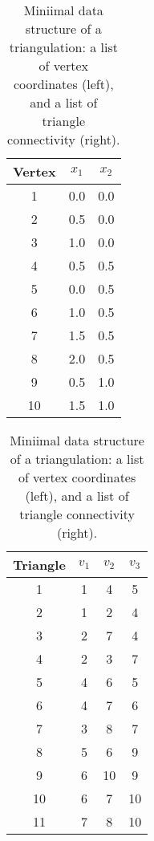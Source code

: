 \begin{table}[!htb]
  \centering
  \caption{Miniimal data structure of a triangulation: a list of vertex coordinates (left), and a list of triangle connectivity (right).}
  \label{tab:vertex-coordinates}
  \begin{minipage}[t]{0.45\textwidth}
    \centering
  \begin{tabular}{|c|c|c|}
  \hline
  \textbf{Vertex} & $x_1$ & $x_2$ \\ \hline
  1 & 0.0 & 0.0 \\ \hline
  2 & 0.5 & 0.0 \\ \hline
  3 & 1.0 & 0.0 \\ \hline
  4 & 0.5 & 0.5 \\ \hline
  5 & 0.0 & 0.5 \\ \hline
  6 & 1.0 & 0.5 \\ \hline
  7 & 1.5 & 0.5 \\ \hline
  8 & 2.0 & 0.5 \\ \hline
  9 & 0.5 & 1.0 \\ \hline
  10 & 1.5 & 1.0 \\ \hline
  \end{tabular}
\end{minipage}
\begin{minipage}[t]{0.45\textwidth}
  \centering
  \begin{tabular}{|c|c|c|c|}
    \hline
    \textbf{Triangle} & $v_1$ & $v_2$ & $v_3$ \\ \hline
    1 & 1 & 4 &  5 \\ \hline
    2 & 1 & 2 &  4  \\ \hline
    3 & 2 & 7 &  4 \\ \hline
    4 & 2 & 3 &  7 \\ \hline
    5 & 4 & 6 &  5 \\ \hline
    6 & 4 & 7 &  6 \\ \hline
    7 & 3 & 8 &  7 \\ \hline
    8 & 5 & 6 &  9 \\ \hline
    9 & 6 & 10 &  9  \\ \hline
    10 & 6 & 7 &  10 \\ \hline
    11 & 7 & 8 &  10 \\ \hline
    \end{tabular}
\end{minipage}
\end{table}

